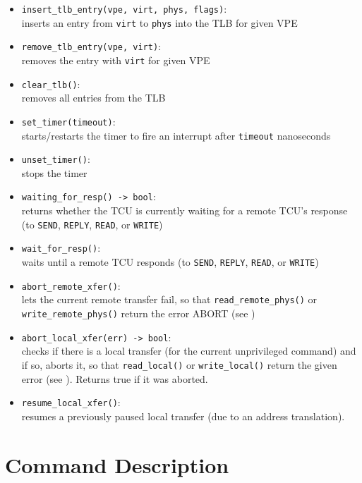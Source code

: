\begin{itemize}
  \item \texttt{insert\_tlb\_entry(vpe, virt, phys, flags)}: \\
  inserts an entry from \texttt{virt} to \texttt{phys} into the TLB for given VPE
  \item \texttt{remove\_tlb\_entry(vpe, virt)}:\\
  removes the entry with \texttt{virt} for given VPE
  \item \texttt{clear\_tlb()}:\\
  removes all entries from the TLB \extend{}
  \item \texttt{set\_timer(timeout)}: \\
  starts/restarts the timer to fire an interrupt after \texttt{timeout} nanoseconds
  \item \texttt{unset\_timer()}:\\
  stops the timer
  \item \texttt{waiting\_for\_resp() -> bool}:\\
  returns whether the TCU is currently waiting for a remote TCU's response (to \texttt{SEND},
  \texttt{REPLY}, \texttt{READ}, or \texttt{WRITE})
  \item \texttt{wait\_for\_resp()}:\\
  waits until a remote TCU responds (to \texttt{SEND}, \texttt{REPLY}, \texttt{READ}, or
  \texttt{WRITE})
  \item \texttt{abort\_remote\_xfer()}:\\
  lets the current remote transfer fail, so that \texttt{read\_remote\_phys()} or \texttt{write\_remote\_phys()}
  return the error ABORT (see )
  \item \texttt{abort\_local\_xfer(err) -> bool}:\\
  checks if there is a local transfer (for the current unprivileged command) and if so, aborts it,
  so that \texttt{read\_local()} or \texttt{write\_local()} return the given error (see
  ). Returns true if it was aborted.
  \item \texttt{resume\_local\_xfer()}:\\
  resumes a previously paused local transfer (due to an address translation). \extend{}
\end{itemize}

\section{Command Description}

